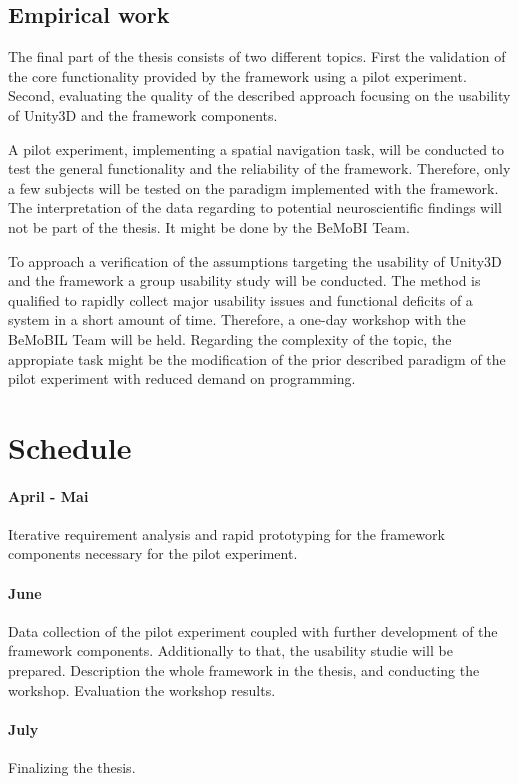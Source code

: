\documentclass[bibtex,apacite]{apa6}
\begin{document}
\subsection*{Empirical work}

The final part of the thesis consists of two different topics. First the validation of the core functionality provided by the framework using a pilot experiment. Second, evaluating the quality of the described approach focusing on the usability of Unity3D and the framework components.

A pilot experiment, implementing a spatial navigation task, will be conducted to test the general functionality and the reliability of the framework. Therefore, only a few subjects will be tested on the paradigm implemented with the framework. The interpretation of the data regarding to potential neuroscientific findings will not be part of the thesis. It might be done by the BeMoBI Team. 

To approach a verification of the assumptions targeting the usability of Unity3D and the framework a group usability study will be conducted. The method is qualified to rapidly collect major usability issues and functional deficits of a system in a short amount of time\cite{downey2007group}.
Therefore, a one-day workshop with the BeMoBIL Team will be held. Regarding the complexity of the topic, the appropiate task might be the modification of the prior described paradigm of the pilot experiment with reduced demand on programming.

\section*{Schedule}

\paragraph{April - Mai} Iterative requirement analysis and rapid prototyping for the framework components necessary for the pilot experiment.
\paragraph{June} Data collection of the pilot experiment coupled with further development of the framework components. Additionally to that, the usability studie will be prepared. Description the whole framework in the thesis, and conducting the workshop. Evaluation the workshop results. 
\paragraph{July} Finalizing the thesis. 

%

\end{document}
